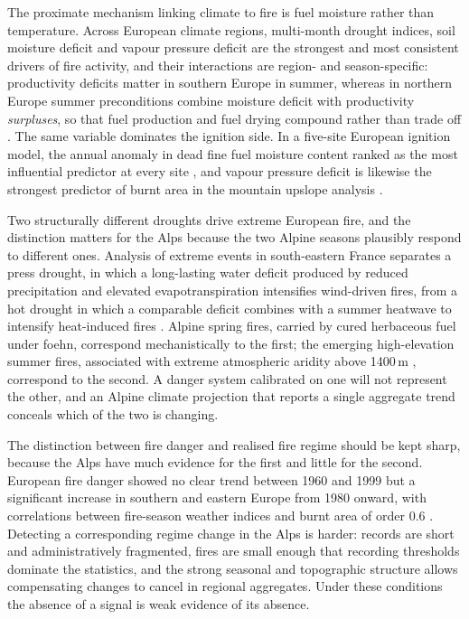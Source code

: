 \documentclass[11pt,a4paper]{article}
\begin{document}
The proximate mechanism linking climate to fire is fuel moisture rather than temperature. Across European climate regions, multi-month drought indices, soil moisture deficit and vapour pressure deficit are the strongest and most consistent drivers of fire activity, and their interactions are region- and season-specific: productivity deficits matter in southern Europe in summer, whereas in northern Europe summer preconditions combine moisture deficit with productivity \emph{surpluses}, so that fuel production and fuel drying compound rather than trade off \citep{miller_compounding_2025}. The same variable dominates the ignition side. In a five-site European ignition model, the annual anomaly in dead fine fuel moisture content ranked as the most influential predictor at every site \citep{gelabert_assessing_2025}, and vapour pressure deficit is likewise the strongest predictor of burnt area in the mountain upslope analysis \citep{beloiu_climatedriven_2026}.

Two structurally different droughts drive extreme European fire, and the distinction matters for the Alps because the two Alpine seasons plausibly respond to different ones. Analysis of extreme events in south-eastern France separates a press drought, in which a long-lasting water deficit produced by reduced precipitation and elevated evapotranspiration intensifies wind-driven fires, from a hot drought in which a comparable deficit combines with a summer heatwave to intensify heat-induced fires \citep{ruffault_extreme_2018}. Alpine spring fires, carried by cured herbaceous fuel under foehn, correspond mechanistically to the first; the emerging high-elevation summer fires, associated with extreme atmospheric aridity above 1400\,m \citep{beloiu_climatedriven_2026}, correspond to the second. A danger system calibrated on one will not represent the other, and an Alpine climate projection that reports a single aggregate trend conceals which of the two is changing.

The distinction between fire danger and realised fire regime should be kept sharp, because the Alps have much evidence for the first and little for the second. European fire danger showed no clear trend between 1960 and 1999 but a significant increase in southern and eastern Europe from 1980 onward, with correlations between fire-season weather indices and burnt area of order 0.6 \citep{venalainen_temporal_2014}. Detecting a corresponding regime change in the Alps is harder: records are short and administratively fragmented, fires are small enough that recording thresholds dominate the statistics, and the strong seasonal and topographic structure allows compensating changes to cancel in regional aggregates. Under these conditions the absence of a signal is weak evidence of its absence.
\end{document}
